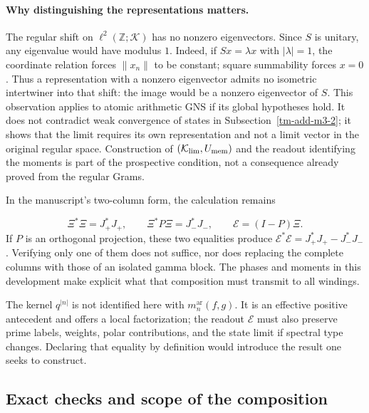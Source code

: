 \paragraph{Why distinguishing the representations matters.}
The regular shift on \(\ell^2(\mathbb Z;\mathcal K)\)
has no nonzero eigenvectors. Since \(S\) is unitary, any
eigenvalue would have modulus \(1\). Indeed, if \(Sx=\lambda x\)
with \(|\lambda|=1\), the coordinate relation forces
\(\|x_n\|\) to be constant; square summability forces \(x=0\).
Thus a representation with a nonzero eigenvector admits
no isometric intertwiner into that shift: the image would be
a nonzero eigenvector of \(S\). This observation applies to
atomic arithmetic GNS if its global hypotheses hold. It does not
contradict weak convergence of states in
Subsection~\ref{tm-add-m3-2}; it shows that the limit requires its own
representation and not a limit vector in the original regular space.
Construction of \((\mathcal K_{\rm lim},U_{\rm mem})\) and the
readout identifying the moments is part of the prospective condition,
not a consequence already proved from the regular Grams.

In the manuscript's two-column form, the calculation remains

\[
\Xi^*\Xi=J_+^*J_+,\qquad
\Xi^*P\Xi=J_-^*J_-,\qquad
\mathcal E=(I-P)\Xi.
\]
If \(P\) is an orthogonal projection, these two equalities produce \(\mathcal E^*\mathcal E=J_+^*J_+-J_-^*J_-\). Verifying only one of them does not suffice, nor does replacing the complete columns with those of an isolated gamma block. The phases and moments in this development make explicit what that composition must transmit to all windings.

The kernel \(q^{|n|}\) is not identified here with \(m_n^{\mathrm{ar}}(f,g)\). It is an effective positive antecedent and offers a local factorization; the readout \(\mathcal E\) must also preserve prime labels, weights, polar contributions, and the state limit if spectral type changes. Declaring that equality by definition would introduce the result one seeks to construct.


\subsection{Exact checks and scope of the composition}
\label{tm-add-m8}

